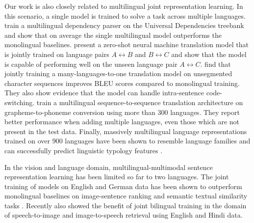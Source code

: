 Our work is also closely related to multilingual joint representation learning. 
In this scenario, a single model is trained to solve a task across multiple languages. 
\cite{ammar2016many} train a multilingual dependency parser on the Universal Dependencies treebank \citep{nivre2015universal} and show that on average the single multilingual model outperforms the monolingual baselines.  
\cite{johnson2016google} present a zero-shot neural machine translation model that is 
jointly trained on language pairs
$A \leftrightarrow B$ and $B \leftrightarrow C$ and show that the model is capable of performing well on the unseen
language pair $A \leftrightarrow C$. 
\cite{lee2017fully} find that jointly training a many-languages-to-one translation model on unsegmented character sequences improves BLEU scores compared to monolingual training. 
They also show evidence that the model can handle intra-sentence code-switching. 
\cite{peters2017massively} train a multilingual sequence-to-sequence translation architecture on grapheme-to-phoneme conversion using more than 300 languages. 
They report better performance when adding multiple languages, even those which are not present in the test data. 
%
Finally, massively multilingual language representations trained on over 900 languages have been shown to resemble language families \citep{ostling2016continuous} and can successfully predict linguistic typology features \citep{malaviya2017learning}. 

In the vision and language domain, multilingual-multimodal sentence representation learning has been limited so far to two languages. The joint training of models on English and German data has been shown to outperform monolingual baselines on image-sentence ranking and semantic textual similarity tasks \citep{gella2017image,calixto2017multilingual}. 
Recently \citep{harwath2018vision} also showed the benefit of joint bilingual training in the domain of speech-to-image and image-to-speech retrieval using English and Hindi data.   

